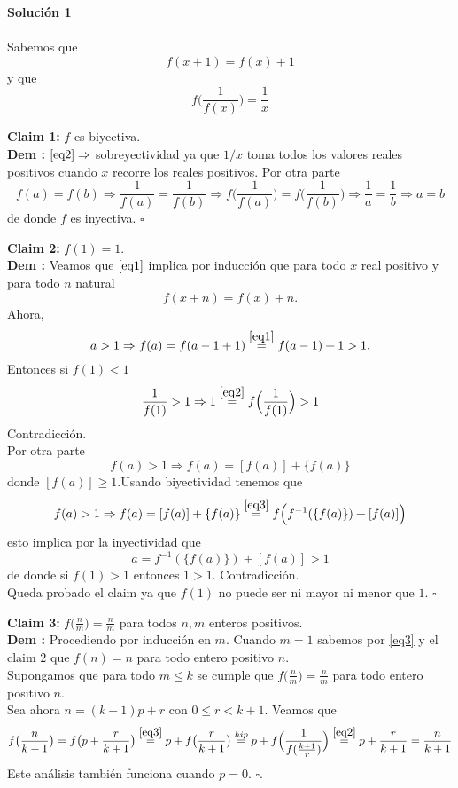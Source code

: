 
\noindent\textbf{Solución 1}\\\\

Sabemos que 
\begin{equation}
\label{eq1}
f(x+1) = f(x)+1
\end{equation}
y que 
\begin{equation}
\label{eq2}
f\Big(\frac{1}{f(x)}\Big) = \frac{1}{x}
\end{equation}

\vspace{0.5cm}

\textbf{Claim 1:} $f$ es  biyectiva.\\
\textbf{Dem :} $\eqref{eq2}\Rightarrow$ sobreyectividad ya que $1/x$ toma todos los valores reales positivos cuando $x$ recorre los reales positivos.
Por otra parte 
\[
f(a) = f(b) \Rightarrow \frac{1}{f(a)} = \frac{1}{f(b)}\Rightarrow f\Big(\frac{1}{f(a)}\Big) = f\Big(\frac{1}{f(b)}\Big)\Rightarrow \frac{1}{a} = \frac{1}{b} \Rightarrow a=b
\]
de donde $f$ es inyectiva. $\square$

\vspace{0.5cm}

\textbf{Claim 2:} $f(1) = 1$.\\
\textbf{Dem :} Veamos que $\eqref{eq1}$ implica por inducción que para todo $x$ real positivo y para todo $n$ natural
\begin{equation}
\label{eq3}
f(x+n) = f(x)+n.
\end{equation}
Ahora,
\[
a>1\Rightarrow f(a) = f(a-1+1) \stackrel{\eqref{eq1}}{=}  f(a-1)+1 > 1.
\]
Entonces si $f(1)< 1$
\[
\frac{1}{f(1)} > 1 \Rightarrow 1 \stackrel{\eqref{eq2}}{=} f\Big(\frac{1}{f(1)}\Big) > 1 
\]
Contradicción.\\

Por otra parte 
\[
f(a) > 1\Rightarrow f(a) = [f(a)] + \{f(a)\}
\]
donde $[f(a)]\ge 1$.Usando biyectividad tenemos que 
\[
f(a) > 1\Rightarrow f(a) = [f(a)] + \{f(a)\} \stackrel{\eqref{eq3}}{=}f\Big( f^{-1}(\{f(a)\})+[f(a)]\Big)
\]
esto implica por la inyectividad que 
\[
a = f^{-1}(\{f(a)\})+[f(a)] > 1
\]
de donde si $f(1)>1$ entonces $1>1$. Contradicción.\\
Queda probado el claim ya que $f(1)$ no puede ser ni mayor ni menor que $1$. $\square$

\vspace{0.5cm}

\textbf{Claim 3:} $f\big(\frac{n}{m}\big) = \frac{n}{m}$ para todos $n,m$ enteros positivos.\\
\textbf{Dem :} Procediendo por inducción en $m$. Cuando $m=1$ sabemos por \eqref{eq3} y el claim $2$ que $f(n) = n$ para todo entero positivo $n$.\\
Supongamos que para todo $m \le k$ se cumple que $f\big(\frac{n}{m}\big) = \frac{n}{m}$ para todo entero positivo $n$.\\
Sea ahora $n = (k+1)p+r$ con $0\le r < k+1$. Veamos que
\[
f\big(\frac{n}{k+1}\big) = f\big(p + \frac{r}{k+1}\big) \stackrel{\eqref{eq3}}{=} p+f\big(\frac{r}{k+1}\big) \stackrel{hip}{=} p+ f\Big(\frac{1}{f(\frac{k+1}{r})}\Big)  \stackrel{\eqref{eq2}}{=} p + \frac{r}{k+1} = \frac{n}{k+1}
\]
Este análisis también funciona cuando $p = 0$. $\square$.

